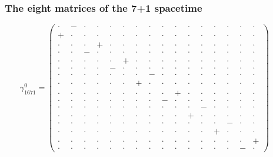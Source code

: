 \documentclass[
  10pt,
]{article}
\begin{document}
\hypertarget{the-eight-matrices-of-the-71-spacetime}{%
\subsubsection{The eight matrices of the 7+1
spacetime}\label{the-eight-matrices-of-the-71-spacetime}}

\[\gamma_{1671}^0=\left(\begin{smallmatrix} \cdot & - & \cdot & \cdot & \cdot & \cdot & \cdot & \cdot & \cdot & \cdot & \cdot & \cdot & \cdot & \cdot & \cdot & \cdot \\ + & \cdot & \cdot & \cdot & \cdot & \cdot & \cdot & \cdot & \cdot & \cdot & \cdot & \cdot & \cdot & \cdot & \cdot & \cdot \\ \cdot & \cdot & \cdot & + & \cdot & \cdot & \cdot & \cdot & \cdot & \cdot & \cdot & \cdot & \cdot & \cdot & \cdot & \cdot \\ \cdot & \cdot & - & \cdot & \cdot & \cdot & \cdot & \cdot & \cdot & \cdot & \cdot & \cdot & \cdot & \cdot & \cdot & \cdot \\ \cdot & \cdot & \cdot & \cdot & \cdot & + & \cdot & \cdot & \cdot & \cdot & \cdot & \cdot & \cdot & \cdot & \cdot & \cdot \\ \cdot & \cdot & \cdot & \cdot & - & \cdot & \cdot & \cdot & \cdot & \cdot & \cdot & \cdot & \cdot & \cdot & \cdot & \cdot \\ \cdot & \cdot & \cdot & \cdot & \cdot & \cdot & \cdot & - & \cdot & \cdot & \cdot & \cdot & \cdot & \cdot & \cdot & \cdot \\ \cdot & \cdot & \cdot & \cdot & \cdot & \cdot & + & \cdot & \cdot & \cdot & \cdot & \cdot & \cdot & \cdot & \cdot & \cdot \\ \cdot & \cdot & \cdot & \cdot & \cdot & \cdot & \cdot & \cdot & \cdot & + & \cdot & \cdot & \cdot & \cdot & \cdot & \cdot \\ \cdot & \cdot & \cdot & \cdot & \cdot & \cdot & \cdot & \cdot & - & \cdot & \cdot & \cdot & \cdot & \cdot & \cdot & \cdot \\ \cdot & \cdot & \cdot & \cdot & \cdot & \cdot & \cdot & \cdot & \cdot & \cdot & \cdot & - & \cdot & \cdot & \cdot & \cdot \\ \cdot & \cdot & \cdot & \cdot & \cdot & \cdot & \cdot & \cdot & \cdot & \cdot & + & \cdot & \cdot & \cdot & \cdot & \cdot \\ \cdot & \cdot & \cdot & \cdot & \cdot & \cdot & \cdot & \cdot & \cdot & \cdot & \cdot & \cdot & \cdot & - & \cdot & \cdot \\ \cdot & \cdot & \cdot & \cdot & \cdot & \cdot & \cdot & \cdot & \cdot & \cdot & \cdot & \cdot & + & \cdot & \cdot & \cdot \\ \cdot & \cdot & \cdot & \cdot & \cdot & \cdot & \cdot & \cdot & \cdot & \cdot & \cdot & \cdot & \cdot & \cdot & \cdot & + \\ \cdot & \cdot & \cdot & \cdot & \cdot & \cdot & \cdot & \cdot & \cdot & \cdot & \cdot & \cdot & \cdot & \cdot & - & \cdot \end{smallmatrix}\right)\qquad
\]
\end{document}
